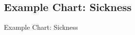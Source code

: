 \subsection{Example Chart: Sickness}
\begin{frame}[t]{Example Chart: Sickness }
\begin{columns}[T, onlytextwidth]

\rule{.1mm}{.35\textheight}


\end{columns}

\end{frame}